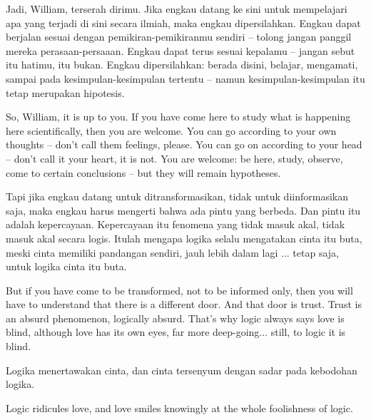 \bahasa
Jadi, William, terserah dirimu. Jika engkau datang ke sini untuk mempelajari apa yang terjadi di sini secara ilmiah, maka engkau dipersilahkan. Engkau dapat berjalan sesuai dengan pemikiran-pemikiranmu sendiri -- tolong jangan panggil mereka perasaan-persaaan. Engkau dapat terus sesuai kepalamu -- jangan sebut itu hatimu, itu bukan. Engkau dipersilahkan: berada disini, belajar, mengamati, sampai pada kesimpulan-kesimpulan tertentu -- namun kesimpulan-kesimpulan itu tetap merupakan hipotesis.

\english
So, William, it is up to you. If you have come here to study what is happening here scientifically, then you are welcome. You can go according to your own thoughts -- don't call them feelings, please. You can go on according to your head -- don't call it your heart, it is not. You are welcome: be here, study, observe, come to certain conclusions -- but they will remain hypotheses.

\bahasa
Tapi jika engkau datang untuk ditransformasikan, tidak untuk diinformasikan saja, maka engkau harus mengerti bahwa ada pintu yang berbeda. Dan pintu itu adalah kepercayaan. Kepercayaan itu fenomena yang tidak masuk akal, tidak masuk akal secara logis. Itulah mengapa logika selalu mengatakan cinta itu buta, meski cinta memiliki pandangan sendiri, jauh lebih dalam lagi ... tetap saja, untuk logika cinta itu buta.

\english
But if you have come to be transformed, not to be informed only, then you will have to understand that there is a different door. And that door is trust. Trust is an absurd phenomenon, logically absurd. That's why logic always says love is blind, although love has its own eyes, far more deep-going... still, to logic it is blind.

\bahasa
Logika menertawakan cinta, dan cinta tersenyum dengan sadar pada kebodohan logika.

\english
Logic ridicules love, and love smiles knowingly at the whole foolishness of logic.


